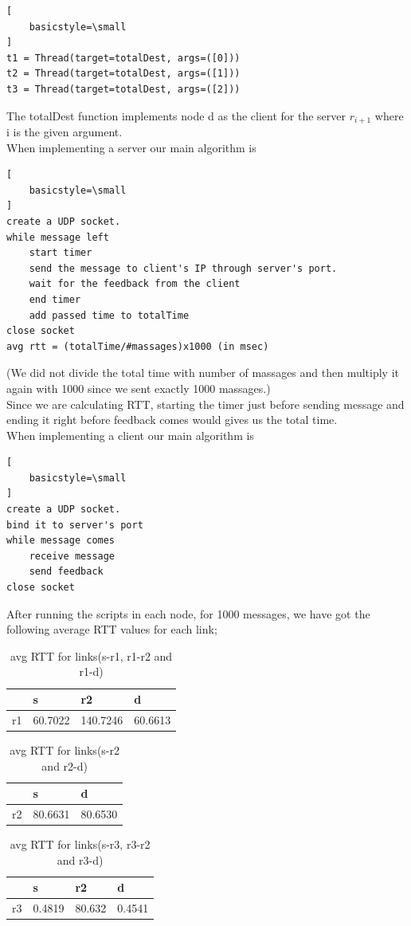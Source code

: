 \documentclass[conference]{IEEEtran}
\begin{document}
\begin{lstlisting}[
    basicstyle=\small
]
t1 = Thread(target=totalDest, args=([0]))
t2 = Thread(target=totalDest, args=([1]))
t3 = Thread(target=totalDest, args=([2]))
\end{lstlisting}
The totalDest function implements node d as the client for the server $r_{i+1}$ where i is the given argument. \\
When implementing a server our main algorithm is 
\begin{lstlisting}[
    basicstyle=\small
]
create a UDP socket.
while message left
    start timer
    send the message to client's IP through server's port.
    wait for the feedback from the client
    end timer
    add passed time to totalTime 
close socket
avg rtt = (totalTime/#massages)x1000 (in msec)
\end{lstlisting}
(We did not divide the total time with number of massages and then multiply it again with 1000 since we sent exactly 1000 massages.) \\
Since we are calculating RTT, starting the timer just before sending message and ending it right before feedback comes would gives us the total time.\\
When implementing a client our main algorithm is 
\begin{lstlisting}[
    basicstyle=\small
]
create a UDP socket.
bind it to server's port
while message comes
    receive message
    send feedback
close socket
\end{lstlisting}
After running the scripts in each node, for 1000 messages, we have got the following average RTT values for each link;
\begin{table}[h!]
\centering
\caption{avg RTT for links(s-r1, r1-r2 and r1-d)}
\begin{tabular}{|l|l|l|l|}
\hline
   & s       & r2       & d       \\ \hline
r1 & 60.7022 & 140.7246 & 60.6613 \\ \hline
\end{tabular}

\end{table}
\begin{table}[h!]
\centering
\caption{avg RTT for links(s-r2 and r2-d)}
\begin{tabular}{|l|l|l|}
\hline
   & s       & d       \\ \hline
r2 & 80.6631 & 80.6530 \\ \hline
\end{tabular}
\end{table}
\begin{table}[h!]
\centering
\caption{avg RTT for links(s-r3, r3-r2 and r3-d)}
\begin{tabular}{|l|l|l|l|}
\hline
   & s     & r2     & d     \\ \hline
r3 & 0.4819 & 80.632 & 0.4541 \\ \hline
\end{tabular}
\end{table}
\end{document}

